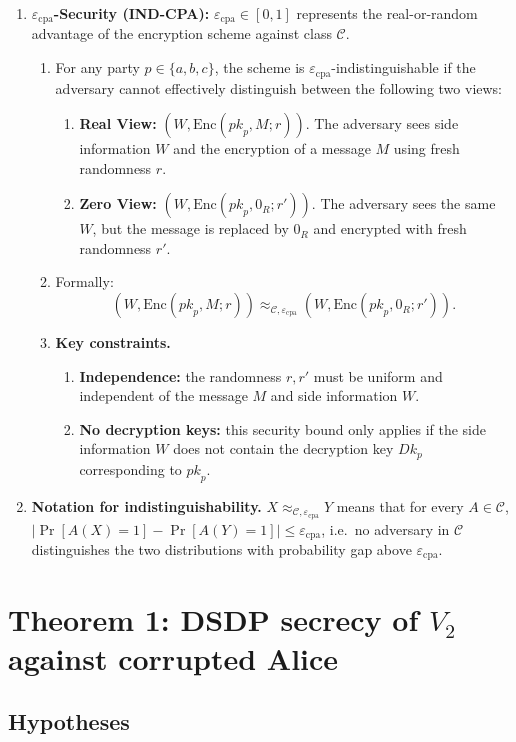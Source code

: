 \documentclass[11pt]{article}
\newcommand{\epscpa}{\varepsilon_{\mathrm{cpa}}}
\newcommand{\C}{\mathcal{C}}
\newcommand{\Encf}{\mathrm{Enc}}
\newcommand{\Dk}{\mathit{Dk}}
\newcommand{\pk}{\mathit{pk}}
\begin{document}
\begin{enumerate}
\item \textbf{$\epscpa$-Security (IND-CPA):} $\epscpa \in [0, 1]$ represents the real-or-random advantage of the encryption scheme against class $\C$.
  \begin{enumerate}[label=8.\arabic*.]
  \item For any party $p \in \{a, b, c\}$, the scheme is $\epscpa$-indistinguishable if the adversary cannot effectively distinguish between the following two views:
    \begin{enumerate}[label=8.1.\arabic*.]
    \item \textbf{Real View:} $(W, \Encf(\pk_p, M; r))$. The adversary sees side information $W$ and the encryption of a message $M$ using fresh randomness $r$.
    \item \textbf{Zero View:} $(W, \Encf(\pk_p, 0_R; r'))$. The adversary sees the same $W$, but the message is replaced by $0_R$ and encrypted with fresh randomness $r'$.
    \end{enumerate}
  \item Formally:
    \[ (W, \Encf(\pk_p, M; r)) \approx_{\C, \epscpa} (W, \Encf(\pk_p, 0_R; r')). \]
  \item \textbf{Key constraints.}
    \begin{enumerate}[label=8.3.\arabic*.]
    \item \textbf{Independence:} the randomness $r, r'$ must be uniform and independent of the message $M$ and side information $W$.
    \item \textbf{No decryption keys:} this security bound only applies if the side information $W$ does not contain the decryption key $\Dk_p$ corresponding to $\pk_p$.
    \end{enumerate}
  \end{enumerate}

\item \textbf{Notation for indistinguishability.} $X \approx_{\C, \epscpa} Y$ means that for every $A \in \C$, $|\Pr[A(X) = 1] - \Pr[A(Y) = 1]| \leq \epscpa$, i.e.\ no adversary in $\C$ distinguishes the two distributions with probability gap above $\epscpa$.
\end{enumerate}

\section*{Theorem 1: DSDP secrecy of $V_2$ against corrupted Alice}

\subsection*{Hypotheses}
\end{document}
